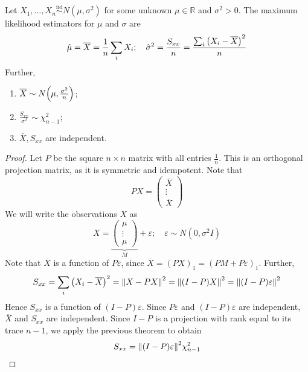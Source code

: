 \begin{theorem}
	Let \( X_1, \dots, X_n \overset{\text{iid}}{\sim} N(\mu,\sigma^2) \) for some unknown \( \mu \in \mathbb R \) and \( \sigma^2 > 0 \).
	The maximum likelihood estimators for \( \mu \) and \( \sigma \) are
	\[
		\hat \mu = \overline X = \frac{1}{n} \sum_i X_i;\quad \hat \sigma^2 = \frac{S_{xx}}{n} = \frac{\sum_i \qty(X_i - \overline X)^2}{n}
	\]
	Further,
	\begin{enumerate}
		\item \( \overline X \sim N\qty(\mu, \frac{\sigma^2}{n}) \);
		\item \( \frac{S_{xx}}{\sigma^2} \sim \chi^2_{n-1} \);
		\item \( \overline X, S_{xx} \) are independent.
	\end{enumerate}
\end{theorem}
\begin{proof}
	Let \( P \) be the square \( n \times n \) matrix with all entries \( \frac{1}{n} \).
	This is an orthogonal projection matrix, as it is symmetric and idempotent.
	Note that
	\[
		PX = \begin{pmatrix}
			\overline X \\
			\vdots      \\
			\overline X
		\end{pmatrix}
	\]
	We will write the observations \( X \) as
	\[
		X = \underbrace{\begin{pmatrix}
				\mu    \\
				\vdots \\
				\mu
			\end{pmatrix}}_{M} + \varepsilon;\quad \varepsilon \sim N(0,\sigma^2 I)
	\]
	Note that \( \overline X \) is a function of \( P \varepsilon \), since \( \overline X = (PX)_1 = (PM + P\varepsilon)_1 \).
	Further,
	\[
		S_{xx} = \sum_i \qty(X_i - \overline X)^2 = \norm{X - PX}^2 = \norm{(I-P)X}^2 = \norm{(I-P)\varepsilon}^2
	\]
	Hence \( S_{xx} \) is a function of \( (I-P)\varepsilon \).
	Since \( P\varepsilon \) and \( (I-P)\varepsilon \) are independent, \( \overline X \) and \( S_{xx} \) are independent.
	Since \( I-P \) is a projection with rank equal to its trace \( n-1 \), we apply the previous theorem to obtain
	\[
		S_{xx} = \norm{(I-P)\varepsilon}^2 \chi^2_{n-1}
	\]
\end{proof}

